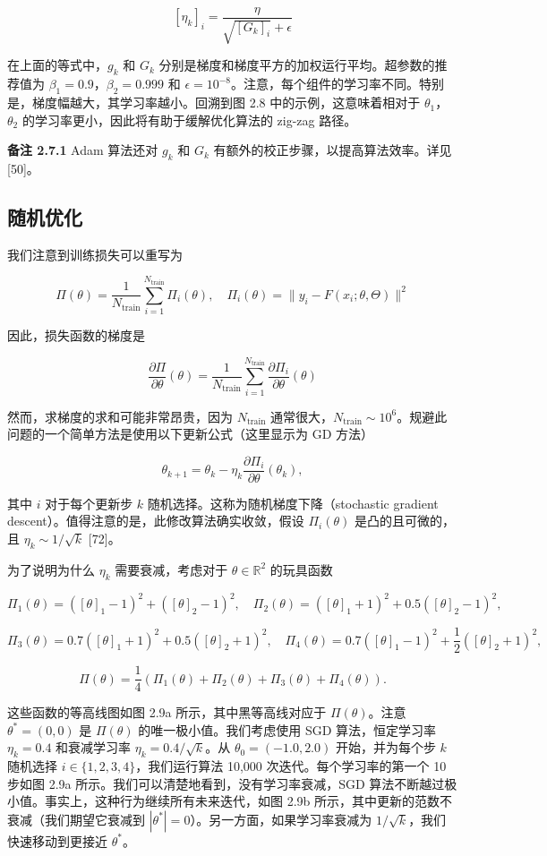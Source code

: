 \[
[\eta_k]_i = \frac{\eta}{\sqrt{[G_k]_i} + \epsilon}
\]

在上面的等式中，$g_k$ 和 $G_k$ 分别是梯度和梯度平方的加权运行平均。超参数的推荐值为 $\beta_1 = 0.9$，$\beta_2 = 0.999$ 和 $\epsilon = 10^{-8}$。注意，每个组件的学习率不同。特别是，梯度幅越大，其学习率越小。回溯到图 2.8 中的示例，这意味着相对于 $\theta_1$，$\theta_2$ 的学习率更小，因此将有助于缓解优化算法的 zig-zag 路径。

\textbf{备注 2.7.1} Adam 算法还对 $g_k$ 和 $G_k$ 有额外的校正步骤，以提高算法效率。详见 [50]。

\subsection{随机优化}

我们注意到训练损失可以重写为

\[
\Pi(\theta) = \frac{1}{N_{\text{train}}} \sum_{i=1}^{N_{\text{train}}} \Pi_i(\theta), \quad \Pi_i(\theta) = \| y_i - F(x_i; \theta, \Theta) \|^2
\]

因此，损失函数的梯度是

\[
\frac{\partial \Pi}{\partial \theta}(\theta) = \frac{1}{N_{\text{train}}} \sum_{i=1}^{N_{\text{train}}} \frac{\partial \Pi_i}{\partial \theta}(\theta)
\]

然而，求梯度的求和可能非常昂贵，因为 $N_{\text{train}}$ 通常很大，$N_{\text{train}} \sim 10^6$。规避此问题的一个简单方法是使用以下更新公式（这里显示为 GD 方法）

\[
\theta_{k+1} = \theta_k - \eta_k \frac{\partial \Pi_i}{\partial \theta}(\theta_k),
\]

其中 $i$ 对于每个更新步 $k$ 随机选择。这称为随机梯度下降（stochastic gradient descent）。值得注意的是，此修改算法确实收敛，假设 $\Pi_i(\theta)$ 是凸的且可微的，且 $\eta_k \sim 1/\sqrt{k}$ [72]。

为了说明为什么 $\eta_k$ 需要衰减，考虑对于 $\theta \in \mathbb{R}^2$ 的玩具函数

\[
\Pi_1(\theta) = ([\theta]_1 - 1)^2 + ([\theta]_2 - 1)^2, \quad \Pi_2(\theta) = ([\theta]_1 + 1)^2 + 0.5 ([\theta]_2 - 1)^2,
\]

\[
\Pi_3(\theta) = 0.7 ([\theta]_1 + 1)^2 + 0.5 ([\theta]_2 + 1)^2, \quad \Pi_4(\theta) = 0.7 ([\theta]_1 - 1)^2 + \frac{1}{2} ([\theta]_2 + 1)^2,
\]

\[
\Pi(\theta) = \frac{1}{4} (\Pi_1(\theta) + \Pi_2(\theta) + \Pi_3(\theta) + \Pi_4(\theta)).
\]

这些函数的等高线图如图 2.9a 所示，其中黑等高线对应于 $\Pi(\theta)$。注意 $\theta^* = (0,0)$ 是 $\Pi(\theta)$ 的唯一极小值。我们考虑使用 SGD 算法，恒定学习率 $\eta_k = 0.4$ 和衰减学习率 $\eta_k = 0.4 / \sqrt{k}$。从 $\theta_0 = (-1.0, 2.0)$ 开始，并为每个步 $k$ 随机选择 $i \in \{1,2,3,4\}$，我们运行算法 10,000 次迭代。每个学习率的第一个 10 步如图 2.9a 所示。我们可以清楚地看到，没有学习率衰减，SGD 算法不断越过极小值。事实上，这种行为继续所有未来迭代，如图 2.9b 所示，其中更新的范数不衰减（我们期望它衰减到 $|\theta^*| = 0$）。另一方面，如果学习率衰减为 $1/\sqrt{k}$，我们快速移动到更接近 $\theta^*$。

